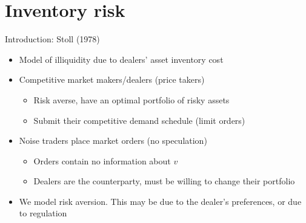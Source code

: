\documentclass[english,10pt]{beamer}
\begin{document}
%
%



\section{Inventory risk}

\begin{frame}{Introduction: Stoll (1978)}
	\begin{itemize}
		\item Model of illiquidity due to dealers' asset inventory cost
		\item Competitive market makers/dealers (price takers)
		\begin{itemize}
			\item Risk averse, have an optimal portfolio of risky assets
			\item Submit their competitive demand schedule (limit orders)
		\end{itemize}
		\item Noise traders place market orders (no speculation)
		\begin{itemize}
			\item Orders contain no information about $v$
			\item Dealers are the counterparty, must be willing to change their portfolio
		\end{itemize}
		\item We model risk aversion. This may be due to the dealer's preferences, or due to regulation
	\end{itemize}
\end{frame}
\end{document}
